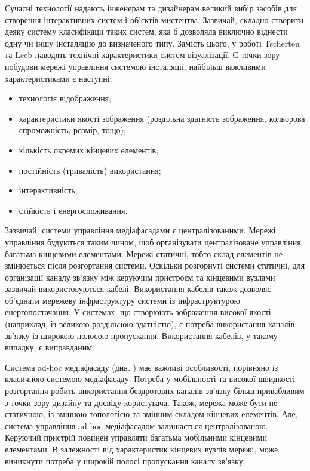 \documentclass[a4paper,ukrainian,utf8,nocolumnsxix,nocolumnxxxii,nocolumnxxxi,floatsection,equationsection]{eskdtext}
\begin{document}
Сучасні технології надають інженерам та дизайнерам великий вибір засобів для створення інтерактивних систем і об'єктів мистецтва. Зазвичай, складно створити деяку систему класифікації таких систем, яка б дозволяла виключно віднести одну чи іншу інсталяцію до визначеного типу. Замість цього, у роботі \cite{media:facades:fundamentals} Tscherteu та Leeb наводять технічні характеристики систем візуалізації. С точки зору побудови мережі управління системою інсталяції, найбільш важливими характеристиками є наступні:

\begin{itemize}
	\item технологія відображення;
	\item характеристики якості зображення (роздільна здатність зображення, кольорова спроможність, розмір, тощо);
	\item кількість окремих кінцевих елементів;
	\item постійність (тривалість) використання;
	\item інтерактивність;
	\item стійкість і енергоспоживання.
\end{itemize}

Зазвичай, системи управління медіафасадами є централізованими. Мережі управління будуються таким чином, щоб організувати централізоване управління багатьма кінцевими елементами. Мережі статичні, тобто склад елементів не змінюється після розгортання системи. Оскільки розгорнуті системи статичні, для організації каналу зв'язку між керуючим пристроєм та кінцевими вузлами зазвичай використовуються кабелі. Використання кабелів також дозволяє об'єднати мережеву інфраструктуру системи із інфраструктурою енергопостачання. У системах, що створюють зображення високої якості (наприклад, із великою роздільною здатністю), є потреба використання каналів зв'язку із широкою полосою пропускання. Використання кабелів, у такому випадку, є виправданим.

Система ad-hoc медіафасаду (див. \cite{idaacs:2013:adhoc:media:facade}) має важливі особливості, порівняно із класичною системою медіафасаду. Потреба у мобільності та високої швидкості розгортання робить використання бездротових каналів зв'язку більш привабливим з точки зору дизайну та досвіду користувача. Також, мережа може бути не статичною, із змінною топологією та змінним складом кінцевих елементів. Але, система управління ad-hoc медіафасадом залишається централізованою. Керуючий пристрій повинен управляти багатьма мобільними кінцевими елементами. В залежності від характеристик кінцевих вузлів мережі, може виникнути потреба у широкій полосі пропускання каналу зв'язку. 
\end{document}
